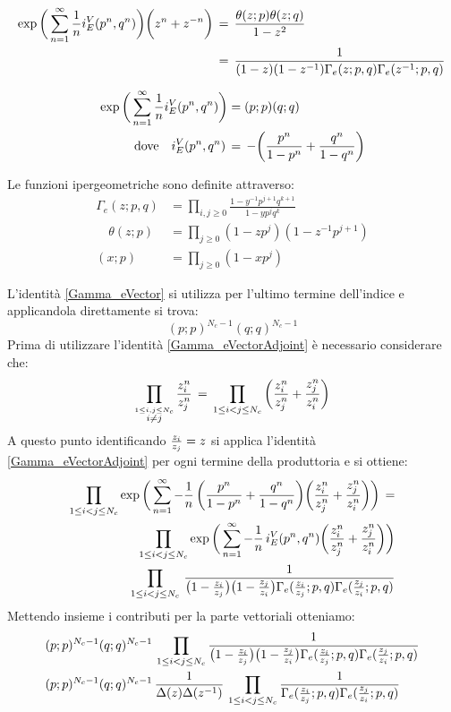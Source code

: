\documentclass[a4paper,12pt]{report}
\begin{document}
\begin{align}
\exp \bigg( \sum_{n=1}^{\infty} {1 \over n} i_E^{V} (p^n,q^n) \bigg) \bigg( z^n + z^{-n} \bigg) \,& = 
\,  \frac{ \theta ( z;p) \theta (z;q) }{ 1-z^2 } \\
& =  \, \frac{1}{ ( 1 - z ) ( 1 - z^{-1}) \Gamma_e( z;p,q) \Gamma_e( z^{-1}; p,q)} \, 
\label{Gamma_eVectorAdjoint} \\ 
\end{align}

\begin{align}
  \exp \bigg( \sum_{n=1}^{\infty} {1 \over n} i_E^{V} (p^n,q^n) \bigg)  &= (p;p) (q;q) \,
  \label{Gamma_eVector} \\
 \mbox{dove} \quad i_E^V(p^n,q^n) \, &= \, - \bigg( {p^n \over 1-p^n} + {q^n \over 1-q^n} \bigg) 
\end{align}

 Le funzioni ipergeometriche sono definite attraverso:
 $$
 \begin{aligned}
   \Gamma_e (z;p,q) &= \prod_{i,j \geq 0} \frac{ 1 - y^{-1} p^{j+1} q^{k+1}}{ 1 - y p^j q^k}\\
  \quad \theta(z;p) &= \prod_{j \geq 0 } (1- z p^j) ( 1- z^{-1}p^{j+1}) \\
  (x;p) &= \prod_{j \geq 0} ( 1- xp^j)
  \end{aligned}
$$

L'identità \ref{Gamma_eVector} si utilizza per l'ultimo termine dell'indice e applicandola direttamente si trova:
$$
	(p;p)^{N_c-1} ( q;q)^{N_c-1}
$$
 Prima di utilizzare l'identità \ref{Gamma_eVectorAdjoint} è necessario considerare che:
 $$
 \prod_{ \overset{ 1 \leq i,j \leq N_c}{ i\neq j }} {z_i^n \over z_j^n} \,  = \, 
  \prod_{ 1 \leq i < j \leq N_c}\bigg( {z_i^n \over z_j^n} + {z_j^n \over z_i^n}   \bigg)
 $$
 A questo punto identificando $ {z_i \over z_j} = z$ si applica l'identità \ref{Gamma_eVectorAdjoint} per ogni termine della produttoria e si ottiene:
\begin{align*}
\prod_{ 1 \leq i < j \leq N_c} \exp \bigg( \sum_{n=1}^{\infty} - {1 \over n} \, \bigg( {p^n \over 1-p^n} + {q^n \over 1-q^n} \bigg)  \bigg( {z_i^n \over z_j^n} + {z_j^n \over z_i^n}\bigg) \bigg) \, =\\
\prod_{ 1 \leq i < j \leq N_c} \exp \bigg( \sum_{n=1}^{\infty} - {1 \over n} \, i_E^V(p^n,q^n)  \bigg( {z_i^n \over z_j^n} + {z_j^n \over z_i^n}\bigg) \bigg) 
\\
 \prod_{ 1 \leq i < j \leq N_c}   \, \frac{ 1 } { \big( 1 -{ z_i \over z_j} \big) \big ( 1 - { z_j \over z_i} \big) \Gamma_e( {z_i \over z_j};p,q) \Gamma_e({z_j \over z_i}; p,q)  }
\end{align*}
 Mettendo insieme i contributi per la parte vettoriali otteniamo:
 \begin{align*}
& (p;p)^{N_c-1} ( q;q)^{N_c-1} \, \prod_{ 1 \leq i < j \leq N_c} \frac{ 1 }{ \big( 1 -{ z_i \over z_j} \big) \big ( 1 - { z_j \over z_i} \big) \Gamma_e( {z_i \over z_j};p,q) \Gamma_e({z_j \over z_i}; p,q)  } \\
& (p;p)^{N_c-1} ( q;q)^{N_c-1} \, \frac{1}{ \Delta(z) \Delta (z^{-1})} \, \prod_{ 1 \leq i < j \leq N_c} \frac{ 1 }{ \Gamma_e( {z_i \over z_j};p,q) \Gamma_e({z_j \over z_i}; p,q)} 
\end{align*}
\end{document}
